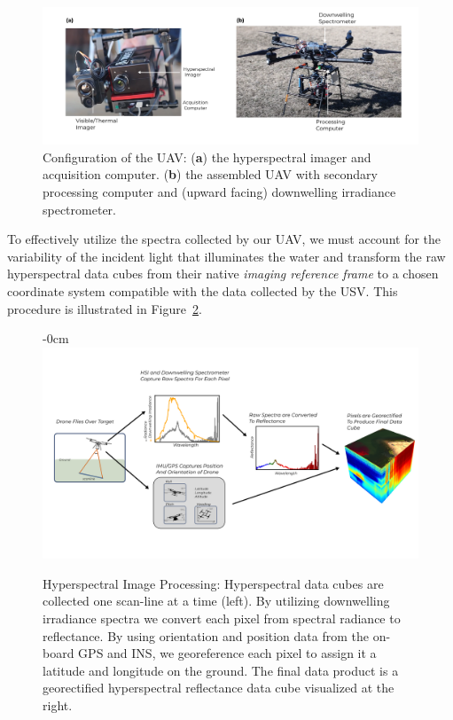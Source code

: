 \documentclass[remotesensing,article,submit,pdftex,moreauthors]{Definitions/mdpi}
\begin{document}
\begin{figure}[t!]
\vspace{-0.3in}
\includegraphics[width=\columnwidth]{paper/figures/materials-and-methods/annotated-drone.pdf}
\vspace{-0.3in}
\caption{Configuration of the UAV: (\textbf{a}) the hyperspectral imager and acquisition computer. (\textbf{b}) the assembled UAV with secondary processing computer and (upward facing) downwelling irradiance spectrometer. \label{fig:drone-components}}
\end{figure} 

To effectively utilize the spectra collected by our UAV, we must account for the variability of the incident light that illuminates the water and transform the raw hyperspectral data cubes from their native \textit{imaging reference frame} to a chosen coordinate system compatible with the data collected by the USV. This procedure is illustrated in Figure~\ref{fig:hsi-pipeline}.

\begin{figure}[b!]
\begin{adjustwidth}{-\extralength}{0cm}
\centering
\vspace{-0.4in}
\includegraphics[width=14cm]{paper/figures/materials-and-methods/pipeline-figure-2.pdf}
\end{adjustwidth}
\vspace{-0.4in}
\caption{Hyperspectral Image Processing: Hyperspectral data cubes are collected one scan-line at a time (left). By utilizing downwelling irradiance spectra we convert each pixel from spectral radiance to reflectance. By using orientation and position data from the on-board GPS and INS, we georeference each pixel to assign it a latitude and longitude on the ground. The final data product is a georectified hyperspectral reflectance data cube visualized at the right. \label{fig:hsi-pipeline}}
\end{figure}  
\end{document}
